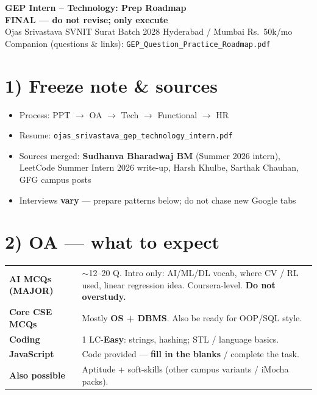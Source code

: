 \documentclass[a4paper,9pt]{extarticle}
\begin{document}
\begin{center}
  {\LARGE\textbf{GEP Intern -- Technology: Prep Roadmap}}\\[0.5pt]
  {\small\color{hot}\textbf{FINAL --- do not revise; only execute}}\\[1pt]
  {\small Ojas Srivastava \textbar{} SVNIT Surat \textbar{} Batch 2028 \textbar{} Hyderabad / Mumbai \textbar{} Rs.\ 50k/mo}\\[0.5pt]
  {\footnotesize\color{muted}
  Companion (questions \& links): \texttt{GEP\_Question\_Practice\_Roadmap.pdf}}
\end{center}

\section{1) Freeze note \& sources}
\begin{itemize}
  \item Process: PPT $\to$ OA $\to$ Tech $\to$ Functional $\to$ HR
  \item Resume: \texttt{ojas\_srivastava\_gep\_technology\_intern.pdf}
  \item Sources merged: \textbf{Sudhanva Bharadwaj BM} (Summer 2026 intern), LeetCode Summer Intern 2026 write-up, Harsh Khulbe, Sarthak Chauhan, GFG campus posts
  \item Interviews \textbf{vary} --- prepare patterns below; do not chase new Google tabs
\end{itemize}

\section{2) OA --- what to expect}
\noindent\begin{tabularx}{\textwidth}{@{}p{3.4cm} X@{}}
\textbf{AI MCQs (MAJOR)} & $\sim$12--20 Q. Intro only: AI/ML/DL vocab, where CV / RL used, linear regression idea. Coursera-level. \textbf{Do not overstudy.} \\
\textbf{Core CSE MCQs} & Mostly \textbf{OS + DBMS}. Also be ready for OOP/SQL style. \\
\textbf{Coding} & 1 LC-\textbf{Easy}: strings, hashing; STL / language basics. \\
\textbf{JavaScript} & Code provided --- \textbf{fill in the blanks} / complete the task. \\
\textbf{Also possible} & Aptitude + soft-skills (other campus variants / iMocha packs). \\
\end{tabularx}
\end{document}

